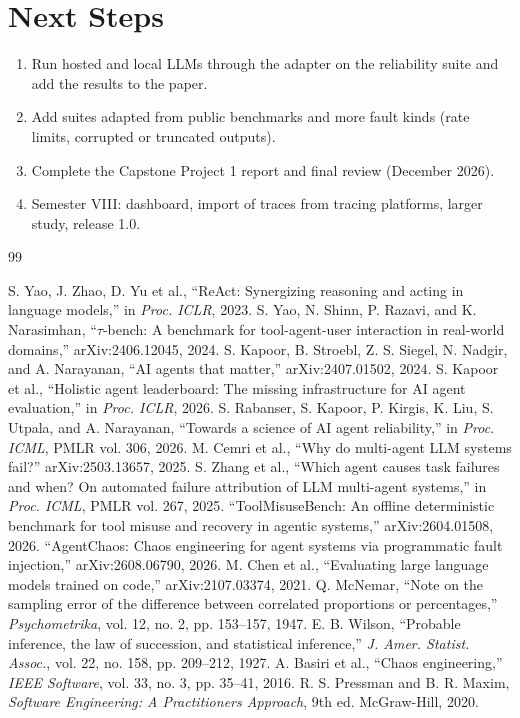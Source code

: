 \documentclass[12pt,a4paper,oneside]{report}
\begin{document}
\section{Next Steps}
\begin{enumerate}
\item Run hosted and local LLMs through the adapter on the reliability suite and add the
results to the paper.
\item Add suites adapted from public benchmarks and more fault kinds (rate limits,
corrupted or truncated outputs).
\item Complete the Capstone Project 1 report and final review (December 2026).
\item Semester VIII: dashboard, import of traces from tracing platforms, larger study,
release 1.0.
\end{enumerate}

\begin{thebibliography}{99}
\begin{singlespace}
 S. Yao, J. Zhao, D. Yu et al., ``ReAct: Synergizing reasoning and acting in language models,'' in \textit{Proc. ICLR}, 2023.
 S. Yao, N. Shinn, P. Razavi, and K. Narasimhan, ``$\tau$-bench: A benchmark for tool-agent-user interaction in real-world domains,'' arXiv:2406.12045, 2024.
 S. Kapoor, B. Stroebl, Z. S. Siegel, N. Nadgir, and A. Narayanan, ``AI agents that matter,'' arXiv:2407.01502, 2024.
 S. Kapoor et al., ``Holistic agent leaderboard: The missing infrastructure for AI agent evaluation,'' in \textit{Proc. ICLR}, 2026.
 S. Rabanser, S. Kapoor, P. Kirgis, K. Liu, S. Utpala, and A. Narayanan, ``Towards a science of AI agent reliability,'' in \textit{Proc. ICML}, PMLR vol. 306, 2026.
 M. Cemri et al., ``Why do multi-agent LLM systems fail?'' arXiv:2503.13657, 2025.
 S. Zhang et al., ``Which agent causes task failures and when? On automated failure attribution of LLM multi-agent systems,'' in \textit{Proc. ICML}, PMLR vol. 267, 2025.
 ``ToolMisuseBench: An offline deterministic benchmark for tool misuse and recovery in agentic systems,'' arXiv:2604.01508, 2026.
 ``AgentChaos: Chaos engineering for agent systems via programmatic fault injection,'' arXiv:2608.06790, 2026.
 M. Chen et al., ``Evaluating large language models trained on code,'' arXiv:2107.03374, 2021.
 Q. McNemar, ``Note on the sampling error of the difference between correlated proportions or percentages,'' \textit{Psychometrika}, vol. 12, no. 2, pp. 153--157, 1947.
 E. B. Wilson, ``Probable inference, the law of succession, and statistical inference,'' \textit{J. Amer. Statist. Assoc.}, vol. 22, no. 158, pp. 209--212, 1927.
 A. Basiri et al., ``Chaos engineering,'' \textit{IEEE Software}, vol. 33, no. 3, pp. 35--41, 2016.
 R. S. Pressman and B. R. Maxim, \textit{Software Engineering: A Practitioner\textquotesingle s Approach}, 9th ed. McGraw-Hill, 2020.
\end{singlespace}
\end{thebibliography}
\end{document}
